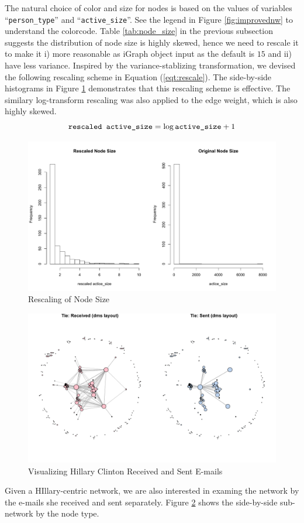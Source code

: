 The natural choice of color and size for nodes is based on the values of variables ``\verb+person_type+'' and ``\verb+active_size+''. See the legend in Figure \ref{fig:improvednw} to understand the colorcode. Table \ref{tab:node_size} in the previous subsection suggests the distribution of node size is highly skewed, hence we need to rescale it to make it i) more reasonable as iGraph object input as the default is $15$ and ii) have less variance. Inspired by the variance-stablizing transformation, we devised the following rescaling scheme in Equation (\ref{eqt:rescale}). The side-by-side histograms in Figure \ref{fig:rescalenode} demonstrates that this rescaling scheme is effective. The similary log-transform rescaling was also applied to the edge weight, which is also highly skewed.
\begin{equation}
\label{eqt:rescale}
\verb+rescaled active_size+ = \log \verb+active_size+ + 1
\end{equation}
\begin{figure}[ht]
\caption{Rescaling of Node Size}
\label{fig:rescalenode}
\centering
\includegraphics[width=.9\textwidth]{report_rescaled_size}
\end{figure}
\begin{figure}[ht]
\caption{Visualizing Hillary Clinton Received and Sent E-mails}
\label{fig:splitnw}
\centering
\includegraphics[width=.9\textwidth]{report_network_compare}
\end{figure}

Given a HIllary-centric network, we are also interested in examing the network by the e-mails she received and sent separately. Figure \ref{fig:splitnw} shows the side-by-side sub-network by the node type.